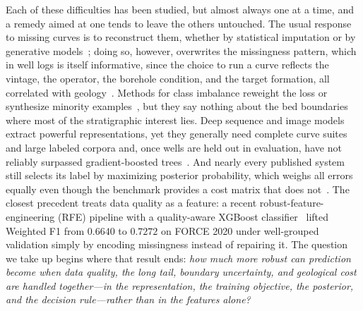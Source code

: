 \documentclass[bdcc,article,submit,pdftex,moreauthors]{Definitions/mdpi}
\begin{document}
Each of these difficulties has been studied, but almost always one at a time, and a remedy
aimed at one tends to leave the others untouched. The usual response to missing curves is to
reconstruct them, whether by statistical imputation or by generative
models~\cite{vanbuuren2011mice,stekhoven2012missforest,liu2025wellgan,xie2024cgan}; doing so,
however, overwrites the missingness pattern, which in well logs is itself informative, since
the choice to run a curve reflects the vintage, the operator, the borehole condition, and the
target formation, all correlated with geology~\cite{chen2026rfe,little2019stats,josse2024missing}.
Methods for class imbalance reweight the loss or synthesize minority
examples~\cite{chawla2002smote,lin2017focal,cui2019classbalanced,he2024imbalanced}, but they
say nothing about the bed boundaries where most of the stratigraphic interest lies. Deep
sequence and image models extract powerful representations, yet they generally need complete
curve suites and large labeled corpora and, once wells are held out in evaluation, have not
reliably surpassed gradient-boosted
trees~\cite{wang2024dnnlitho,grinsztajn2022trees,shwartzziv2022tabular,mcelfresh2024benchmark}.
And nearly every published system still selects its label by maximizing posterior probability,
which weighs all errors equally even though the benchmark provides a cost matrix that does
not~\cite{elkan2001cost,berger1985decision}. The closest precedent treats data quality as a
feature: a recent robust-feature-engineering (RFE) pipeline with a quality-aware XGBoost
classifier~\cite{chen2026rfe} lifted Weighted F1 from $0.6640$ to $0.7272$ on FORCE 2020 under
well-grouped validation simply by encoding missingness instead of repairing it. The question
we take up begins where that result ends: \emph{how much more robust can prediction become when
data quality, the long tail, boundary uncertainty, and geological cost are handled
together---in the representation, the training objective, the posterior, and the decision
rule---rather than in the features alone?}
\end{document}
